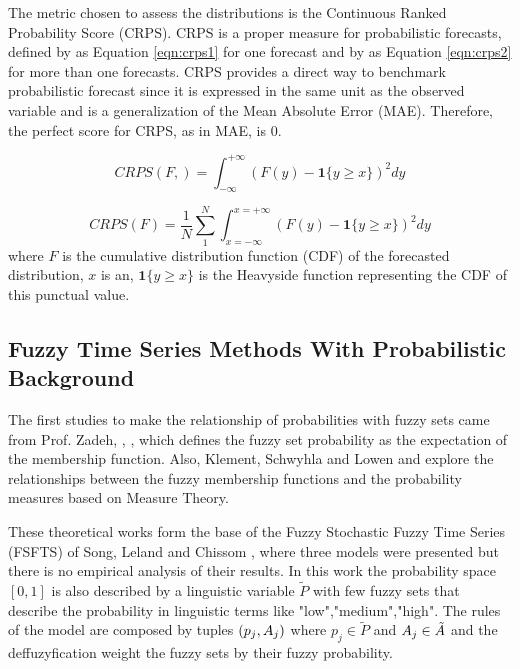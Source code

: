 The metric chosen to assess the distributions is the Continuous Ranked Probability Score (CRPS). CRPS is a proper measure for probabilistic forecasts, defined by  \cite{Gneiting2007b} as Equation \eqref{eqn:crps1} for one forecast and by \cite{Gneiting2007b} as Equation \eqref{eqn:crps2} for more than one forecasts. CRPS provides a direct way to benchmark probabilistic forecast since it is expressed in the same unit as the observed variable and is a generalization of the Mean Absolute Error (MAE). Therefore, the perfect score for CRPS, as in MAE, is 0.

\begin{equation}
CRPS(F,) = \int_{-\infty}^{+\infty} (F(y) - \mathbf{1}\{y \geq x\})^2  dy
\label{eqn:crps1}
\end{equation}

\begin{equation}
CRPS(F) = \frac{1}{N} \sum_{1}^{N} \int_{x=-\infty}^{x=+\infty} (F(y) - \mathbf{1}\{y \geq x\})^2  dy
\label{eqn:crps2}
\end{equation}
where $F$ is the cumulative distribution function (CDF) of the forecasted distribution, $x$ is  an, $\mathbf{1}\{y \geq x\}$ is the Heavyside function representing the CDF of this punctual value.

%
\subsection{Fuzzy Time Series Methods With Probabilistic Background}

The first studies to make the relationship of probabilities with fuzzy sets came from Prof. Zadeh, \cite{Zadeh1968}, \cite{Zadeh1984}, which defines the fuzzy set probability as the expectation of the membership function. Also, Klement, Schwyhla and Lowen \cite{ErichPeterKLEMENT1981} and \cite{Dubois1989} explore the relationships between the fuzzy membership functions and the probability measures based on Measure Theory. 

These theoretical works form the base of the Fuzzy Stochastic Fuzzy Time Series (FSFTS) of Song, Leland and Chissom \cite{Song1997}, where three models were presented but there is no empirical analysis of their results. In this work the probability space $[0,1]$ is also described by a linguistic variable $\tilde{P}$ with few fuzzy sets that describe the probability in linguistic terms like "low","medium","high". The rules of the model are composed by tuples $(p_j,A_j)$ where $p_j \in \tilde{P}$ and $A_j \in \tilde{A}$ and the deffuzyfication weight the fuzzy sets by their fuzzy probability.

